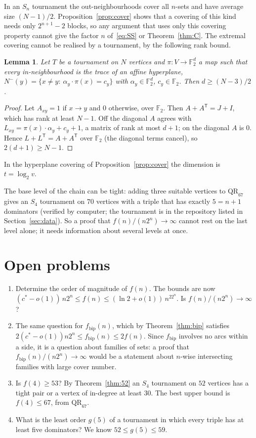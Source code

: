 \documentclass[11pt]{amsart}
\newtheorem{lemma}[theorem]{Lemma}
\theoremstyle{definition}
\theoremstyle{remark}
\newcommand{\Nin}{N^{-}}
\newcommand{\QR}{\mathrm{QR}}
\newcommand{\cs}{c^{*}}
\newcommand{\fb}{f_{\mathrm{bip}}}
\begin{document}
In an $S_n$ tournament the out-neighbourhoods cover all $n$-sets and have average size $(N-1)/2$. Proposition~\ref{prop:cover} shows
that a covering of this kind needs only $2^{n+1}-2$ blocks, so any argument that uses only this covering property cannot give the
factor $n$ of~\eqref{eq:SS} or Theorem~\ref{thm:C}. The extremal covering cannot be realised by a tournament, by the following
rank bound.

\begin{lemma}\label{lem:rank}
Let $T$ be a tournament on $N$ vertices and $\pi:V\to\mathbb F_2^d$ a map such that every in-neighbourhood is the trace of an affine
hyperplane, $\Nin(y)=\{x\ne y:\ \alpha_y\cdot\pi(x)=c_y\}$ with $\alpha_y\in\mathbb F_2^d$, $c_y\in\mathbb F_2$. Then $d\ge(N-3)/2$.
\end{lemma}

\begin{proof}
Let $A_{xy}=1$ if $x\to y$ and $0$ otherwise, over $\mathbb F_2$. Then $A+A^{\mathsf T}=J+I$, which has rank at least $N-1$. Off the
diagonal $A$ agrees with $L_{xy}=\pi(x)\cdot\alpha_y+c_y+1$, a matrix of rank at most $d+1$; on the diagonal $A$ is $0$. Hence
$L+L^{\mathsf T}=A+A^{\mathsf T}$ over $\mathbb F_2$ (the diagonal terms cancel), so $2(d+1)\ge N-1$.
\end{proof}

In the hyperplane covering of Proposition~\ref{prop:cover} the dimension is $t=\log_2 v$.

The base level of the chain can be tight: adding three suitable vertices to $\QR_{67}$ gives an $S_4$ tournament on $70$ vertices
with a triple that has exactly $5=n+1$ dominators (verified by computer; the tournament is in the repository listed in Section~\ref{sec:data}). So a proof that
$f(n)/(n2^n)\to\infty$ cannot rest on the last level alone; it needs information about several levels at once.

\section{Open problems}\label{sec:open}

\begin{enumerate}
\item Determine the order of magnitude of $f(n)$. The bounds are now
$(\cs-o(1))\,n2^n\le f(n)\le(\ln2+o(1))\,n^22^n$. Is $f(n)/(n2^n)\to\infty$?
\item The same question for $\fb(n)$, which by Theorem~\ref{thm:bip} satisfies $2(\cs-o(1))n2^n\le\fb(n)\le2f(n)$. Since $\fb$
involves no arcs within a side, it is a question about families of sets: a proof that $\fb(n)/(n2^n)\to\infty$ would be a
statement about $n$-wise intersecting families with large cover number.
\item Is $f(4)\ge53$? By Theorem~\ref{thm:52} an $S_4$ tournament on $52$ vertices has a tight pair or a vertex of in-degree at
least $30$. The best upper bound is $f(4)\le67$, from $\QR_{67}$.
\item What is the least order $g(5)$ of a tournament in which every triple has at least five dominators? We know
$52\le g(5)\le59$.
\end{enumerate}
\end{document}
